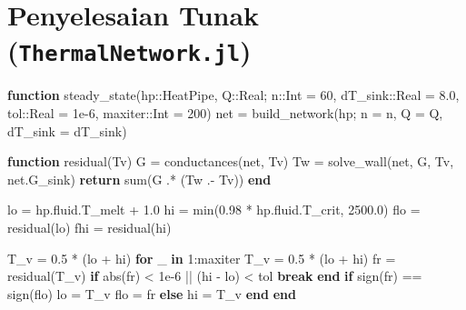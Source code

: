 \documentclass[
  indonesian,
  12pt,
  a4paper,
]{report}
\newenvironment{Shaded}{\begin{snugshade}}{\end{snugshade}}
\newcommand{\ControlFlowTok}[1]{\textcolor[rgb]{0.00,0.23,0.31}{\textbf{#1}}}
\newcommand{\DataTypeTok}[1]{\textcolor[rgb]{0.68,0.00,0.00}{#1}}
\newcommand{\FloatTok}[1]{\textcolor[rgb]{0.68,0.00,0.00}{#1}}
\newcommand{\FunctionTok}[1]{\textcolor[rgb]{0.28,0.35,0.67}{#1}}
\newcommand{\KeywordTok}[1]{\textcolor[rgb]{0.00,0.23,0.31}{\textbf{#1}}}
\newcommand{\NormalTok}[1]{\textcolor[rgb]{0.00,0.23,0.31}{#1}}
\newcommand{\OperatorTok}[1]{\textcolor[rgb]{0.37,0.37,0.37}{#1}}
\begin{document}
\section{\texorpdfstring{Penyelesaian Tunak
(\texttt{ThermalNetwork.jl})}{Penyelesaian Tunak (ThermalNetwork.jl)}}\label{penyelesaian-tunak-thermalnetwork.jl}

\begin{Shaded}
\begin{Highlighting}[]
\KeywordTok{function} \FunctionTok{steady\_state}\NormalTok{(hp}\OperatorTok{::}\DataTypeTok{HeatPipe}\NormalTok{, Q}\OperatorTok{::}\DataTypeTok{Real}\NormalTok{; n}\OperatorTok{::}\DataTypeTok{Int }\OperatorTok{=} \FloatTok{60}\NormalTok{,}
\NormalTok{                      dT\_sink}\OperatorTok{::}\DataTypeTok{Real }\OperatorTok{=} \FloatTok{8.0}\NormalTok{, tol}\OperatorTok{::}\DataTypeTok{Real }\OperatorTok{=} \FloatTok{1e{-}6}\NormalTok{,}
\NormalTok{                      maxiter}\OperatorTok{::}\DataTypeTok{Int }\OperatorTok{=} \FloatTok{200}\NormalTok{)}
\NormalTok{    net }\OperatorTok{=} \FunctionTok{build\_network}\NormalTok{(hp; n }\OperatorTok{=}\NormalTok{ n, Q }\OperatorTok{=}\NormalTok{ Q, dT\_sink }\OperatorTok{=}\NormalTok{ dT\_sink)}

    \KeywordTok{function} \FunctionTok{residual}\NormalTok{(Tv)}
\NormalTok{        G }\OperatorTok{=} \FunctionTok{conductances}\NormalTok{(net, Tv)}
\NormalTok{        Tw }\OperatorTok{=} \FunctionTok{solve\_wall}\NormalTok{(net, G, Tv, net.G\_sink)}
        \ControlFlowTok{return} \FunctionTok{sum}\NormalTok{(G }\OperatorTok{.*}\NormalTok{ (Tw }\OperatorTok{.{-}}\NormalTok{ Tv))}
    \KeywordTok{end}

\NormalTok{    lo }\OperatorTok{=}\NormalTok{ hp.fluid.T\_melt }\OperatorTok{+} \FloatTok{1.0}
\NormalTok{    hi }\OperatorTok{=} \FunctionTok{min}\NormalTok{(}\FloatTok{0.98} \OperatorTok{*}\NormalTok{ hp.fluid.T\_crit, }\FloatTok{2500.0}\NormalTok{)}
\NormalTok{    flo }\OperatorTok{=} \FunctionTok{residual}\NormalTok{(lo)}
\NormalTok{    fhi }\OperatorTok{=} \FunctionTok{residual}\NormalTok{(hi)}

\NormalTok{    T\_v }\OperatorTok{=} \FloatTok{0.5} \OperatorTok{*}\NormalTok{ (lo }\OperatorTok{+}\NormalTok{ hi)}
    \ControlFlowTok{for}\NormalTok{ \_ }\KeywordTok{in} \FloatTok{1}\OperatorTok{:}\NormalTok{maxiter}
\NormalTok{        T\_v }\OperatorTok{=} \FloatTok{0.5} \OperatorTok{*}\NormalTok{ (lo }\OperatorTok{+}\NormalTok{ hi)}
\NormalTok{        fr }\OperatorTok{=} \FunctionTok{residual}\NormalTok{(T\_v)}
        \ControlFlowTok{if} \FunctionTok{abs}\NormalTok{(fr) }\OperatorTok{\textless{}} \FloatTok{1e{-}6} \OperatorTok{||}\NormalTok{ (hi }\OperatorTok{{-}}\NormalTok{ lo) }\OperatorTok{\textless{}}\NormalTok{ tol}
            \ControlFlowTok{break}
        \ControlFlowTok{end}
        \ControlFlowTok{if} \FunctionTok{sign}\NormalTok{(fr) }\OperatorTok{==} \FunctionTok{sign}\NormalTok{(flo)}
\NormalTok{            lo }\OperatorTok{=}\NormalTok{ T\_v}
\NormalTok{            flo }\OperatorTok{=}\NormalTok{ fr}
        \ControlFlowTok{else}
\NormalTok{            hi }\OperatorTok{=}\NormalTok{ T\_v}
        \ControlFlowTok{end}
    \ControlFlowTok{end}


\end{Highlighting}
\end{Shaded}
\end{document}
